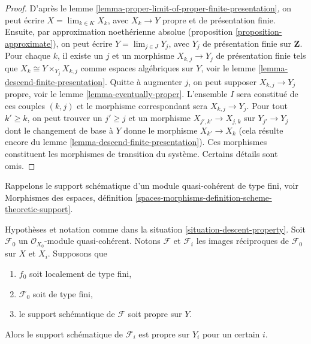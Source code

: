 \begin{proof}
D'après le lemme \ref{lemma-proper-limit-of-proper-finite-presentation},
on peut écrire $X = \lim_{k \in K} X_k$, avec $X_k \to Y$ propre et
de présentation finie. Ensuite, par approximation noethérienne absolue
(proposition \ref{proposition-approximate}), on peut
écrire $Y = \lim_{j \in J} Y_j$, avec $Y_j$ de présentation finie
sur $\mathbf{Z}$.
Pour chaque $k$, il existe un $j$ et un morphisme $X_{k, j} \to Y_j$
de présentation finie tels que $X_k \cong Y \times_{Y_j} X_{k, j}$
comme espaces algébriques sur $Y$, voir le
lemme \ref{lemma-descend-finite-presentation}.
Quitte à augmenter $j$, on peut supposer $X_{k, j} \to Y_j$ propre, voir le
lemme \ref{lemma-eventually-proper}. L'ensemble $I$ sera constitué
de ces couples $(k, j)$ et le morphisme correspondant sera $X_{k, j} \to Y_j$.
Pour tout $k' \geq k$, on peut trouver un $j' \geq j$ et un morphisme
$X_{j', k'} \to X_{j, k}$ sur $Y_{j'} \to Y_j$ dont le changement de base à $Y$
donne le morphisme $X_{k'} \to X_k$ (cela résulte encore du
lemme \ref{lemma-descend-finite-presentation}).
Ces morphismes constituent les morphismes de transition du système. Certains détails
sont omis.
\end{proof}

\noindent
Rappelons le support schématique d'un
module quasi-cohérent de type fini, voir
Morphismes des espaces, définition
\ref{spaces-morphisms-definition-scheme-theoretic-support}.

\begin{lemma}
\label{lemma-eventually-proper-support}
Hypothèses et notation comme dans la situation \ref{situation-descent-property}.
Soit $\mathcal{F}_0$ un $\mathcal{O}_{X_0}$-module quasi-cohérent.
Notons $\mathcal{F}$ et $\mathcal{F}_i$ les images réciproques de
$\mathcal{F}_0$ sur $X$ et $X_i$. Supposons que
\begin{enumerate}
\item $f_0$ soit localement de type fini,
\item $\mathcal{F}_0$ soit de type fini,
\item le support schématique de $\mathcal{F}$ soit propre sur $Y$.
\end{enumerate}
Alors le support schématique de $\mathcal{F}_i$ est propre sur $Y_i$
pour un certain $i$.
\end{lemma}

